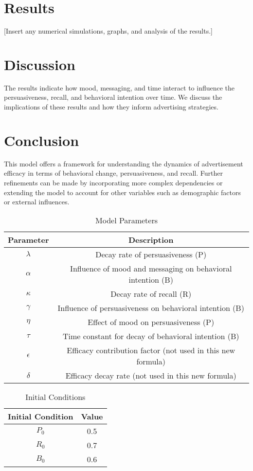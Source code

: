 \documentclass[12pt,a4paper]{article}
\begin{document}
\section{Results}
[Insert any numerical simulations, graphs, and analysis of the results.]

\section{Discussion}
The results indicate how mood, messaging, and time interact to influence the persuasiveness, recall, and behavioral intention over time. We discuss the implications of these results and how they inform advertising strategies.

\section{Conclusion}
This model offers a framework for understanding the dynamics of advertisement efficacy in terms of behavioral change, persuasiveness, and recall. Further refinements can be made by incorporating more complex dependencies or extending the model to account for other variables such as demographic factors or external influences.


\begin{table}[ht!]
\centering
\begin{tabular}{|c|c|}
\hline
\textbf{Parameter} & \textbf{Description} \\
\hline
$\lambda$ & Decay rate of persuasiveness (P) \\
$\alpha$ & Influence of mood and messaging on behavioral intention (B) \\
$\kappa$ & Decay rate of recall (R) \\
$\gamma$ & Influence of persuasiveness on behavioral intention (B) \\
$\eta$ & Effect of mood on persuasiveness (P) \\
$\tau$ & Time constant for decay of behavioral intention (B) \\
$\epsilon$ & Efficacy contribution factor (not used in this new formula) \\
$\delta$ & Efficacy decay rate (not used in this new formula) \\
\hline
\end{tabular}
\caption{Model Parameters}
\end{table}

\begin{table}[ht!]
\centering
\begin{tabular}{|c|c|}
\hline
\textbf{Initial Condition} & \textbf{Value} \\
\hline
$P_0$ & 0.5 \\
$R_0$ & 0.7 \\
$B_0$ & 0.6 \\
\hline
\end{tabular}
\caption{Initial Conditions}
\end{table}




\end{document}
